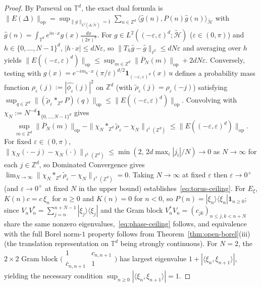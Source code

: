 \documentclass[11pt,a4paper]{article}
\theoremstyle{definition}
\theoremstyle{remark}
\newcommand{\tH}{\widetilde{\mathcal{H}}}
\newcommand{\ZZ}{\mathbb{Z}}
\newcommand{\TT}{\mathbb{T}}
\newcommand{\op}{\mathrm{op}}
\newcommand{\one}{\mathbf{1}}
\newcommand{\ket}[1]{|#1\rangle}
\newcommand{\bra}[1]{\langle #1|}
\newcommand{\ip}[2]{\langle #1, #2 \rangle}
\newcommand{\norm}[1]{\|#1\|}
\begin{document}
\begin{proof}
By Parseval on $\TT^d$, the exact dual formula is $\norm{E(\Delta)}_{\op}=\sup_{\norm{g}_{L^2(\Delta;\tH)}=1}\sum_{n\in\ZZ^d}\ip{\widehat{g}(n)}{P(n)\widehat{g}(n)}_{\tH}$ with $\widehat{g}(n)=\int_{\TT^d} e^{in\cdot x}g(x)\frac{dx}{(2\pi)^d}$. For $g\in L^2((-\varepsilon,\varepsilon)^d;\tH)$ ($\varepsilon\in(0,\pi)$) and $h\in\{0,\dots,N-1\}^d$, $|h\cdot x|\le d N\varepsilon$, so $\norm{T_h\widehat{g}-\widehat{g}}_{\ell^2}\le d N\varepsilon$ and averaging over $h$ yields $\norm{E((-\varepsilon,\varepsilon)^d)}_{\op}\le \sup_{m\in\ZZ^d}\norm{\overline{P}_N(m)}_{\op}+2 d N\varepsilon$. Conversely, testing with $g(x)=e^{-im_0\cdot x}(\pi/\varepsilon)^{d/2}\one_{(-\varepsilon,\varepsilon)^d}(x)\,u$ defines a probability mass function $\rho_\varepsilon(j):=|\widehat{\phi_\varepsilon}(j)|^2$ on $\ZZ^d$ (with $\widetilde{\rho}_\varepsilon(j)=\rho_\varepsilon(-j)$) satisfying $\sup_{q\in\ZZ^d}\norm{(\widetilde{\rho}_\varepsilon *_{\ZZ^d} P)(q)}_{\op}\le \norm{E((-\varepsilon,\varepsilon)^d)}_{\op}$. Convolving with $\chi_N := N^{-d}\one_{\{0,\dots,N-1\}^d}$ gives
\[
\sup_{m\in\ZZ^d}\norm{\overline{P}_N(m)}_{\op} - \norm{\chi_N *_{\ZZ^d}\widetilde{\rho}_\varepsilon - \chi_N}_{\ell^1(\ZZ^d)}
\le \norm{E((-\varepsilon,\varepsilon)^d)}_{\op}.
\]
For fixed $\varepsilon\in(0,\pi)$, $\norm{\chi_N(\cdot-j)-\chi_N(\cdot)}_{\ell^1(\ZZ^d)}\le \min(2,\,2d\max_i|j_i|/N)\to 0$ as $N\to\infty$ for each $j\in\ZZ^d$, so Dominated Convergence gives $\lim_{N\to\infty}\norm{\chi_N*_{\ZZ^d}\widetilde{\rho}_\varepsilon-\chi_N}_{\ell^1(\ZZ^d)}=0$. Taking $N\to\infty$ at fixed $\varepsilon$ then $\varepsilon\to 0^+$ (and $\varepsilon\to 0^+$ at fixed $N$ in the upper bound) establishes~\eqref{eq:torus-ceiling}. For $E_\xi$, $K(n)c=c\,\xi_n$ for $n\ge 0$ and $K(n)=0$ for $n<0$, so $P(n)=\ket{\xi_n}\bra{\xi_n}\one_{n\ge 0}$; since $V_n V_n^* = \sum_{j=n}^{n+N-1}\ket{\xi_j}\bra{\xi_j}$ and the Gram block $V_n^* V_n = (c_{jk})_{n\le j,k<n+N}$ share the same nonzero eigenvalues,~\eqref{eq:phase-ceiling} follows, and equivalence with the full Borel norm-$1$ property follows from Theorem~\ref{thm:open-borel}(iii) (the translation representation on $\TT^d$ being strongly continuous). For $N=2$, the $2\times 2$ Gram block $\bigl(\begin{smallmatrix}1 & c_{n,n+1}\\ \bar c_{n,n+1} & 1\end{smallmatrix}\bigr)$ has largest eigenvalue $1+|\ip{\xi_n}{\xi_{n+1}}|$, yielding the necessary condition $\sup_{n\ge 0}|\ip{\xi_n}{\xi_{n+1}}|=1$.
\end{proof}
\end{document}
